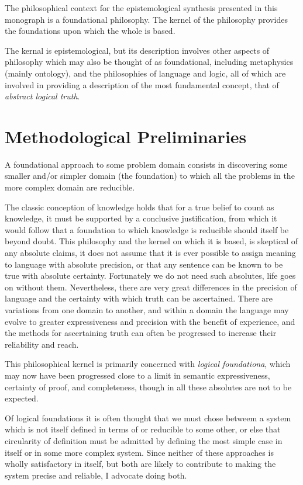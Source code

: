 The philosophical context for the epistemological synthesis presented in this monograph is a foundational philosophy.
The kernel of the philosophy provides the foundations upon which the whole is based.

The kernal is epistemological, but its description involves other aspects of philosophy which may also be thought of as foundational, including metaphysics (mainly ontology), and the philosophies of language and logic, all of which are involved in providing a description of the most fundamental concept, that of \emph{abstract logical truth}.

\section{Methodological Preliminaries}

A foundational approach to some problem domain consists in discovering some smaller and/or simpler domain (the foundation) to which all the problems in the more complex domain are reducible.

The classic conception of knowledge holds that for a true belief to count as knowledge, it must be supported by a conclusive justification, from which it would follow that a foundation to which knowledge is reducible should itself be beyond doubt.
This philosophy and the kernel on which it is based, is skeptical of any absolute claims, it does not assume that it is ever possible to assign meaning to language with absolute precision, or that any sentence can be known to be true with absolute certainty.
Fortunately we do not need such absolutes, life goes on without them.
Nevertheless, there are very great differences in the precision of language and the certainty with which truth can be ascertained.
There are variations from one domain to another, and within a domain the language may evolve to greater expressiveness and precision with the benefit of experience, and the methods for ascertaining truth can often be progressed to increase their reliability and reach.

This philosophical kernel is primarily concerned with \emph{logical foundationa}, which may now have been progressed close to a limit in semantic expressiveness, certainty of proof, and completeness, though in all these absolutes are not to be expected.

Of logical foundations it is often thought that we must chose betweem a system which is not itself defined in terms of or reducible to some other, or else that circularity of definition must be admitted by defining the most simple case in itself or in some more complex system.
Since neither of these approaches is wholly satisfactory in itself, but both are likely to contribute to making the system precise and reliable, I advocate doing both. 


